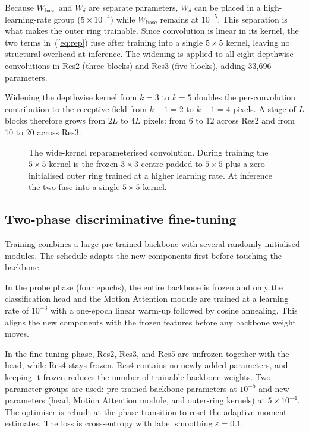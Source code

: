 \documentclass[conference]{IEEEtran}
\begin{document}
Because $W_{\text{base}}$ and $W_\delta$ are separate parameters,
$W_\delta$ can be placed in a high-learning-rate group
($5 \times 10^{-4}$) while $W_{\text{base}}$ remains at $10^{-5}$.
This separation is what makes the outer ring trainable. Since
convolution is linear in its kernel, the two terms in~(\ref{eq:rep})
fuse after training into a single $5 \times 5$ kernel, leaving no
structural overhead at inference. The widening is applied to all eight
depthwise convolutions in Res2 (three blocks) and Res3 (five blocks),
adding 33{,}696 parameters.

Widening the depthwise kernel from $k=3$ to $k=5$ doubles the
per-convolution contribution to the receptive field from $k-1=2$ to
$k-1=4$ pixels. A stage of $L$ blocks therefore grows from $2L$ to
$4L$ pixels: from 6 to 12 across Res2 and from 10 to 20 across Res3.

\begin{figure}[t]
  \centering
  \caption{The wide-kernel reparameterised convolution. During training
  the $5 \times 5$ kernel is the frozen $3 \times 3$ centre padded to
  $5 \times 5$ plus a zero-initialised outer ring trained at a higher
  learning rate. At inference the two fuse into a single $5 \times 5$
  kernel.}
  \label{fig:wk}
\end{figure}

\subsection{Two-phase discriminative fine-tuning}

Training combines a large pre-trained backbone with several randomly
initialised modules. The schedule adapts the new components first
before touching the backbone.

In the probe phase (four epochs), the entire backbone is frozen and
only the classification head and the Motion Attention module are
trained at a learning rate of $10^{-3}$ with a one-epoch linear
warm-up followed by cosine annealing. This aligns the new components
with the frozen features before any backbone weight moves.

In the fine-tuning phase, Res2, Res3, and Res5 are unfrozen together
with the head, while Res4 stays frozen. Res4 contains no newly added
parameters, and keeping it frozen reduces the number of trainable
backbone weights. Two parameter groups are used: pre-trained backbone
parameters at $10^{-5}$ and new parameters (head, Motion Attention
module, and outer-ring kernels) at $5 \times 10^{-4}$. The optimiser
is rebuilt at the phase transition to reset the adaptive moment
estimates. The loss is cross-entropy with label smoothing
$\varepsilon = 0.1$.
\end{document}

